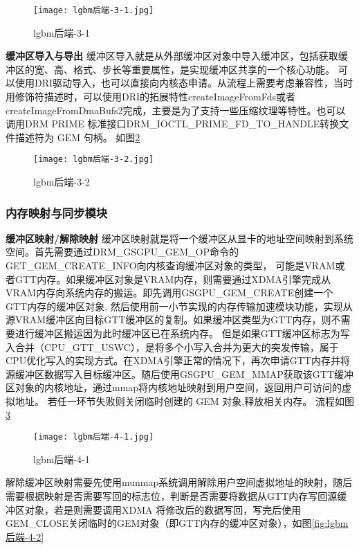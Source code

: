 \begin{figure}[h]
  \centering
  \texttt{[image: lgbm后端-3-1.jpg]}
  \caption{lgbm后端-3-1}
  \label{fig:lgbm后端-3-1}
\end{figure}  

\textbf{缓冲区导入与导出}
缓冲区导入就是从外部缓冲区对象中导入缓冲区，包括获取缓冲区的宽、高、格式、步长等重要属性，是实现缓冲区共享的一个核心功能。
可以使用DRI驱动导入，也可以直接向内核态申请。从流程上需要考虑兼容性，当时用修饰符描述时，可以使用DRI的拓展特性createImageFromFds或者
createImageFromDmaBufs2完成，主要是为了支持一些压缩纹理等特性。也可以调用​DRM PRIME 标准接口​DRM\_IOCTL\_PRIME\_FD\_TO\_HANDLE转换文件描述符为 GEM 句柄。
如图\ref{fig:lgbm后端-3-2}

\begin{figure}[h]
  \centering
  \texttt{[image: lgbm后端-3-2.jpg]}
  \caption{lgbm后端-3-2}
  \label{fig:lgbm后端-3-2}
\end{figure}  

\subsubsection{内存映射与同步模块}

\textbf{缓冲区映射/解除映射}
缓冲区映射就是将一个缓冲区从显卡的地址空间映射到系统空间。首先需要通过DRM\_GSGPU\_GEM\_OP命令的GET\_GEM\_CREATE\_INFO向内核查询缓冲区对象的类型，
可能是VRAM或者GTT内存。如果缓冲区对象是VRAM内存，则需要通过XDMA引擎完成从VRAM内存向系统内存的搬运。即先调用GSGPU\_GEM\_CREATE创建一个GTT内存的缓冲区对象,
然后使用前一小节实现的内存传输加速模块功能，实现从源VRAM缓冲区向目标GTT缓冲区的复制。如果缓冲区类型为GTT内存，则不需要进行缓冲区搬运因为此时缓冲区已在系统内存。
但是如果GTT缓冲区标志为写入合并（CPU\_GTT\_USWC），是将多个小写入合并为更大的突发传输，属于CPU优化写入的实现方式。在XDMA引擎正常的情况下，再次申请GTT内存并将
源缓冲区数据写入目标缓冲区。随后使用GSGPU\_GEM\_MMAP获取该GTT缓冲区对象的内核地址，通过mmap将内核地址映射到用户空间，返回用户可访问的虚拟地址。
若任一环节失败则关闭临时创建的 GEM 对象,释放相关内存。
流程如图\ref{fig:lgbm后端-4-1}

\begin{figure}[h]
  \centering
  \texttt{[image: lgbm后端-4-1.jpg]}
  \caption{lgbm后端-4-1}
  \label{fig:lgbm后端-4-1}
\end{figure} 

解除缓冲区映射需要先使用munmap系统调用解除用户空间虚拟地址的映射，随后需要根据映射是否需要写回的标志位，判断是否需要将数据从GTT内存写回源缓冲区对象，若是则需要调用XDMA
将修改后的数据写回，写完后使用GEM\_CLOSE关闭临时的GEM对象（即GTT内存的缓冲区对象），如图\ref{fig:lgbm后端-4-2}

